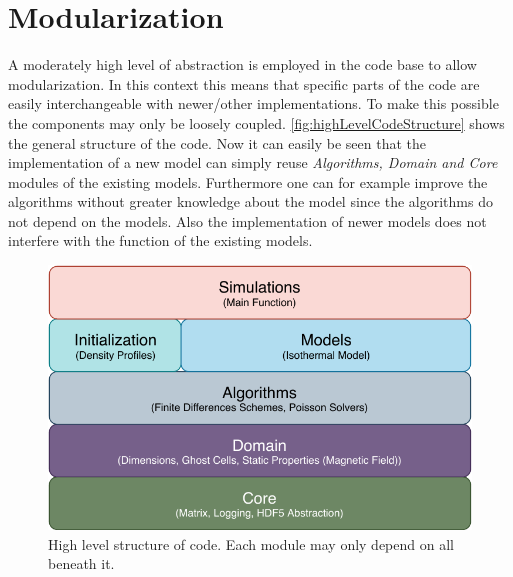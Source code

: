 \documentclass[master.tex]{subfiles}
\begin{document}
\section{Modularization}
A moderately high level of abstraction is employed in the code base to allow modularization. In this context this means that specific parts of the code are easily interchangeable with newer/other implementations. To make this possible the components may only be loosely coupled. \autoref{fig:highLevelCodeStructure} shows the general structure of the code. Now it can easily be seen that the implementation of a new model can simply reuse \textit{Algorithms, Domain and Core} modules of the existing models. Furthermore one can for example improve the algorithms without greater knowledge about the model since the algorithms do not depend on the models. Also the implementation of newer models does not interfere with the function of the existing models.
\begin{figure}[h]
    \centering
    \includegraphics[]{pdfs/code_modules_high_level.pdf}
    \caption{High level structure of code. Each module may only depend on all beneath it.}
    \label{fig:highLevelCodeStructure}
\end{figure}
\end{document}
